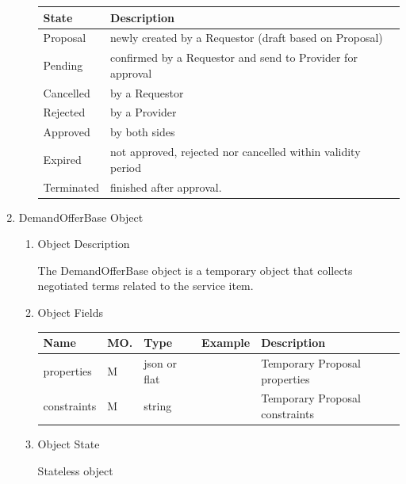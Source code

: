 \begin{enumerate}
\begin{enumerate}
\begin{table}[H]
\footnotesize

\begin{center}
\begin{tabular}{|p{3cm}|p{11cm}|} 
\hline
\rowcolor{lightgray}	State	& 	Description \\
\hline

Proposal	&	newly created by a Requestor (draft based on Proposal) \\
\hline
Pending		&	confirmed by a Requestor and send to Provider for approval \\
\hline
Cancelled 	& 	by a Requestor \\
\hline
Rejected 	&	by a Provider \\
\hline
Approved 	&	by both sides \\
\hline
Expired 	&	not approved, rejected nor cancelled within validity period \\
\hline
Terminated 	&	finished after approval. \\
\hline

\end{tabular}
\end{center}
\end{table}

\end{enumerate}

\item DemandOfferBase Object

\begin{enumerate}

\item Object Description

The DemandOfferBase object is a temporary object that collects negotiated terms related to the service item.

\item Object Fields

\begin{table}[H]
\footnotesize

\begin{center}
\begin{tabular}{|p{3cm}|l|p{3cm}|p{3cm}|p{4cm}|} 
\hline
\rowcolor{lightgray}	Name	& MO.	& Type	& Example & 	Description \\
\hline

properties	& M	& 	json or flat	&		&  Temporary Proposal properties \\ 

\hline

constraints	& M	& 	string	&		&	Temporary Proposal constraints \\ 

\hline

\end{tabular}
\end{center}
\end{table}

\item Object State

Stateless object

\end{enumerate}

\end{enumerate}

